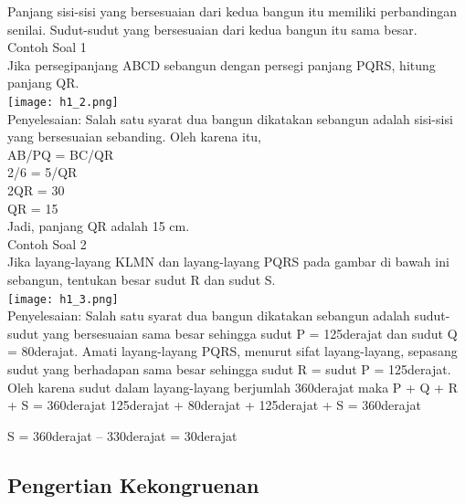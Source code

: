 \documentclass[11pt,fleqn]{book} %
\begin{document}
Panjang sisi-sisi yang bersesuaian dari kedua bangun itu memiliki perbandingan senilai.
Sudut-sudut yang bersesuaian dari kedua bangun itu sama besar.\\


Contoh Soal 1\\
Jika persegipanjang ABCD sebangun dengan persegi panjang PQRS, hitung panjang QR.\\
 \texttt{[image: h1\_2.png]}\\
 
Penyelesaian:
Salah satu syarat dua bangun dikatakan sebangun adalah sisi-sisi yang bersesuaian sebanding. Oleh karena itu,\\
AB/PQ = BC/QR\\
2/6 = 5/QR\\
2QR = 30\\
QR = 15\\
Jadi, panjang QR adalah 15 cm.\\


Contoh Soal 2\\
Jika layang-layang KLMN dan layang-layang PQRS pada gambar di bawah ini sebangun, tentukan besar sudut R dan sudut S.\\
 \texttt{[image: h1\_3.png]}\\

Penyelesaian:
Salah satu syarat dua bangun dikatakan sebangun adalah sudut-sudut yang bersesuaian sama besar sehingga sudut P = 125derajat dan sudut Q = 80derajat. Amati layang-layang PQRS, menurut sifat layang-layang, sepasang sudut yang berhadapan sama besar sehingga sudut R = sudut P = 125derajat. Oleh karena sudut dalam layang-layang berjumlah 360derajat maka
P + Q + R + S = 360derajat
125derajat + 80derajat + 125derajat + S = 360derajat

S = 360derajat – 330derajat = 30derajat\\


\subsection{Pengertian Kekongruenan}
\end{document}
